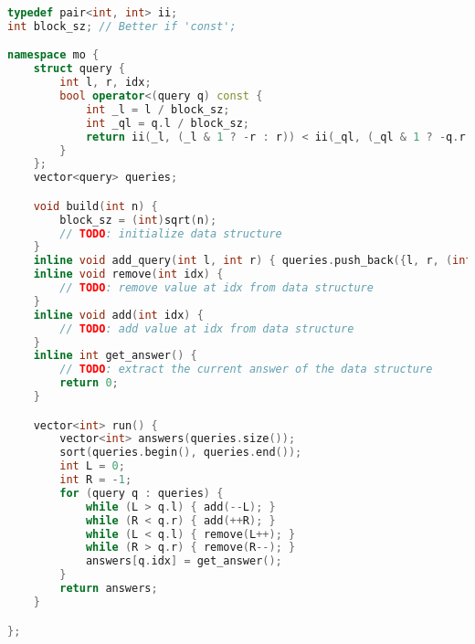 \documentclass[11pt, a4paper, twoside]{article}
\begin{document}
\begin{lstlisting}[language=C++]
typedef pair<int, int> ii;
int block_sz; // Better if 'const';

namespace mo {
    struct query {
        int l, r, idx;
        bool operator<(query q) const {
            int _l = l / block_sz;
            int _ql = q.l / block_sz;
            return ii(_l, (_l & 1 ? -r : r)) < ii(_ql, (_ql & 1 ? -q.r : q.r));
        }
    };
    vector<query> queries;

    void build(int n) {
        block_sz = (int)sqrt(n);
        // TODO: initialize data structure
    }
    inline void add_query(int l, int r) { queries.push_back({l, r, (int)queries.size()}); }
    inline void remove(int idx) {
        // TODO: remove value at idx from data structure
    }
    inline void add(int idx) {
        // TODO: add value at idx from data structure
    }
    inline int get_answer() {
        // TODO: extract the current answer of the data structure
        return 0;
    }

    vector<int> run() {
        vector<int> answers(queries.size());
        sort(queries.begin(), queries.end());
        int L = 0;
        int R = -1;
        for (query q : queries) {
            while (L > q.l) { add(--L); }
            while (R < q.r) { add(++R); }
            while (L < q.l) { remove(L++); }
            while (R > q.r) { remove(R--); }
            answers[q.idx] = get_answer();
        }
        return answers;
    }

};
\end{lstlisting}
\end{document}
